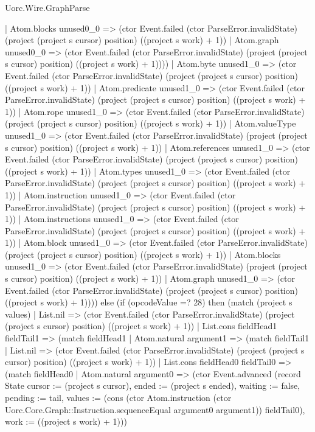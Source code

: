 \begin{lexlean}{Uorc.Wire.GraphParse}
\begin{semanticmodule}
{              | Atom.blocks unused0_0 => (ctor Event.failed (ctor ParseError.invalidState) (project (project s cursor) position) ((project s work) + 1))
              | Atom.graph unused0_0 => (ctor Event.failed (ctor ParseError.invalidState) (project (project s cursor) position) ((project s work) + 1))))
          | Atom.byte unused1_0 => (ctor Event.failed (ctor ParseError.invalidState) (project (project s cursor) position) ((project s work) + 1))
          | Atom.predicate unused1_0 => (ctor Event.failed (ctor ParseError.invalidState) (project (project s cursor) position) ((project s work) + 1))
          | Atom.rope unused1_0 => (ctor Event.failed (ctor ParseError.invalidState) (project (project s cursor) position) ((project s work) + 1))
          | Atom.valueType unused1_0 => (ctor Event.failed (ctor ParseError.invalidState) (project (project s cursor) position) ((project s work) + 1))
          | Atom.references unused1_0 => (ctor Event.failed (ctor ParseError.invalidState) (project (project s cursor) position) ((project s work) + 1))
          | Atom.types unused1_0 => (ctor Event.failed (ctor ParseError.invalidState) (project (project s cursor) position) ((project s work) + 1))
          | Atom.instruction unused1_0 => (ctor Event.failed (ctor ParseError.invalidState) (project (project s cursor) position) ((project s work) + 1))
          | Atom.instructions unused1_0 => (ctor Event.failed (ctor ParseError.invalidState) (project (project s cursor) position) ((project s work) + 1))
          | Atom.block unused1_0 => (ctor Event.failed (ctor ParseError.invalidState) (project (project s cursor) position) ((project s work) + 1))
          | Atom.blocks unused1_0 => (ctor Event.failed (ctor ParseError.invalidState) (project (project s cursor) position) ((project s work) + 1))
          | Atom.graph unused1_0 => (ctor Event.failed (ctor ParseError.invalidState) (project (project s cursor) position) ((project s work) + 1)))) else (if (opcodeValue =? 28) then (match (project s values)
        | List.nil => (ctor Event.failed (ctor ParseError.invalidState) (project (project s cursor) position) ((project s work) + 1))
        | List.cons fieldHead1 fieldTail1 => (match fieldHead1
          | Atom.natural argument1 => (match fieldTail1
            | List.nil => (ctor Event.failed (ctor ParseError.invalidState) (project (project s cursor) position) ((project s work) + 1))
            | List.cons fieldHead0 fieldTail0 => (match fieldHead0
              | Atom.natural argument0 => (ctor Event.advanced (record State {cursor := (project s cursor), ended := (project s ended), waiting := false, pending := tail, values := (cons (ctor Atom.instruction (ctor Uorc.Core.Graph::Instruction.sequenceEqual argument0 argument1)) fieldTail0), work := ((project s work) + 1)}))
}
\end{semanticmodule}
\end{lexlean}
